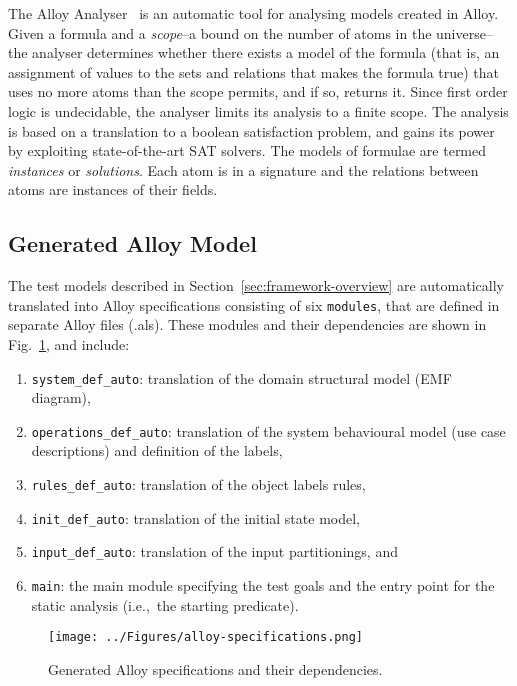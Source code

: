 The Alloy Analyser~\cite{Jackson2000} is an automatic tool for analysing models created in Alloy. Given a formula and a \textit{scope}--a bound on the number of atoms in the universe--the analyser determines whether there exists a model of the formula (that is, an assignment of values to the sets and relations that makes the formula true) that uses no more atoms than the scope permits, and if so, returns it. Since first order logic is undecidable, the analyser limits its analysis to a finite scope. The analysis is based on a translation to a boolean satisfaction problem, and gains its power by exploiting state-of-the-art SAT solvers. The models of formulae are termed \textit{instances} or \textit{solutions}. Each atom is in a signature and the relations between atoms are instances of their fields.

\subsection{Generated Alloy Model}
\label{sec:test-generation-execution-alloy-models}
The test models described in Section~\ref{sec:framework-overview} are automatically translated into Alloy specifications consisting of six \texttt{modules}, that are defined in separate Alloy files (.als). These modules and their dependencies are shown in Fig.~\ref{fig:alloy-specifications}, and include:

\begin{enumerate}
	\item \texttt{system\_def\_auto}: translation of the domain structural model (EMF diagram),
	\item \texttt{operations\_def\_auto}: translation of the system behavioural model (use case descriptions) and definition of the labels,
	\item \texttt{rules\_def\_auto}: translation of the object labels rules,
	\item \texttt{init\_def\_auto}: translation of the initial state model, 
	\item \texttt{input\_def\_auto}: translation of the input partitionings, and
	\item \texttt{main}: the main module specifying the test goals and the entry point for the static analysis (i.e.,\ the starting predicate).
\end{enumerate}

\begin{figure}[h]
\centering
\texttt{[image: ../Figures/alloy-specifications.png]}
\caption{Generated Alloy specifications and their dependencies.}
\label{fig:alloy-specifications}
\end{figure}

